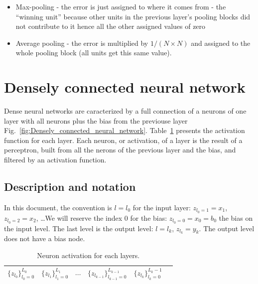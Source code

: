 \documentclass[final, paper=letter,5p,times,twocolumn]{elsarticle}
\begin{document}
\begin{itemize}
    \item Max-pooling - the error is just assigned to where it comes from - the “winning unit” because other units in the previous layer’s pooling blocks did not contribute to it hence all the other assigned values of zero
    \item Average pooling - the error is multiplied by $1 / (N \times N)$ and assigned to the whole pooling block (all units get this same value).
\end{itemize}

\section{Densely connected neural network}

Dense neural networks are caracterized by a full connection of a neurons of one layer with all neurons plus the bias from the previouse layer Fig.~\ref{fig:Densely_connected_neural_network}. Table~\ref{Layers_activations} presents the activation function for each layer. Each neuron, or activation, of a layer is the result of a perceptron, built from all the nerons of the previous layer and the bias, and filtered by an activation function. 

\subsection{Description and notation}

In this document, the convention is $l = l_{0}$ for the input layer: $z_{l_{0} = 1} = x_{1}$, $z_{l_{0} = 2} = x_{2}$, \dots We will reserve the index 0 for the bias: $z_{l_{0} = 0} = x_{0} = b_{0}$ the bias on the input level. The last level is the output level: $l = l_{k}$, $z_{l_{k}} = y_{k}$. The output level does not have a bias node.

\begin{table}[]
\centering
\caption{Neuron activation for each layers.}
\label{Layers_activations}
\begin{tabular}{llllll}
  \hline
 $\{ z_{l_{0}}\}_{l_{0} = 0}^{L_{0}}$&  $\{ z_{l_{1}}\}_{l_{1} = 0}^{L_{1}}$ &  $\cdots$ & $\{ z_{l_{k-1}}\}_{l_{k-1} = 0}^{L_{k-1}}$ &  $\{ z_{l_{k}}\}_{l_{k} = 0}^{L_{k}-1}$ &  \\ 
  \hline
\end{tabular}
\end{table}
\end{document}
